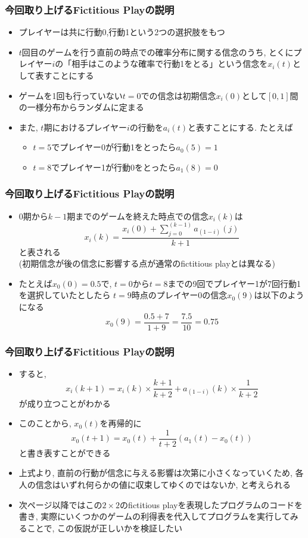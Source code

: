 \documentclass[dvipdfmx,fleqn,handout]{beamer}
\begin{document}
\begin{frame}
\frametitle{今回取り上げるFictitious Playの説明}
\begin{itemize}\setlength{\parskip}{0.5em}
\item
プレイヤーは共に行動0,行動1という2つの選択肢をもつ\pause
\item
$t$回目のゲームを行う直前の時点での確率分布に関する信念のうち, とくにプレイヤー$i$の「相手はこのような確率で行動1をとる」という信念を$x_i(t)$として表すことにする\pause
\item
ゲームを1回も行っていない$t=0$での信念は初期信念$x_i(0)$として$[0,1]$間の一様分布からランダムに定まる\pause
\item
また, $t$期におけるプレイヤー$i$の行動を$a_i(t)$と表すことにする. たとえば
\begin{itemize}\setlength{\parskip}{0.5em}
\item$t=5$でプレイヤー0が行動1をとったら$a_0(5)=1$
\item$t=8$でプレイヤー1が行動0をとったら$a_1(8)=0$
\end{itemize}
\end{itemize}
\end{frame}

\begin{frame}
\frametitle{今回取り上げるFictitious Playの説明}
\begin{itemize}\setlength{\parskip}{0.5em}
\item
$0$期から$k-1$期までのゲームを終えた時点での信念$x_i(k)$は
\[
x_i(k)=\frac{x_i(0)+\sum_{j=0}^{(k-1)} a_{(1-i)}(j)}{k+1}
\]
と表される\\
(初期信念が後の信念に影響する点が通常のfictitious playとは異なる)\pause
\item
たとえば$x_0(0)=0.5$で, $t=0$から$t=8$までの9回でプレイヤー1が7回行動1を選択していたとしたら
$t=9$時点のプレイヤー0の信念$x_0(9)$は以下のようになる
\[
x_0(9)=\frac{0.5+7}{1+9}=\frac{7.5}{10}=0.75
\]
\end{itemize}
\end{frame}

\begin{frame}
\frametitle{今回取り上げるFictitious Playの説明}
\begin{itemize}\setlength{\parskip}{0.5em}
\item
すると, 
\[
x_i(k+1)=x_i(k)\times\frac{k+1}{k+2}+a_{(1-i)}(k)\times\frac{1}{k+2}
\]
が成り立つことがわかる\pause
\item
このことから, $x_0(t)$を再帰的に
\[
x_0(t+1)
= x_0(t) + \frac{1}{t+2} (a_1(t) - x_0(t))
\]
と書き表すことができる\pause
\item
上式より, 直前の行動が信念に与える影響は次第に小さくなっていくため, 各人の信念はいずれ何らかの値に収束してゆくのではないか, と考えられる\pause
\item
次ページ以降ではこの$2\times2$のfictitious playを表現したプログラムのコードを書き, 実際にいくつかのゲームの利得表を代入してプログラムを実行してみることで, この仮説が正しいかを検証したい
\end{itemize}
\end{frame}
\end{document}
